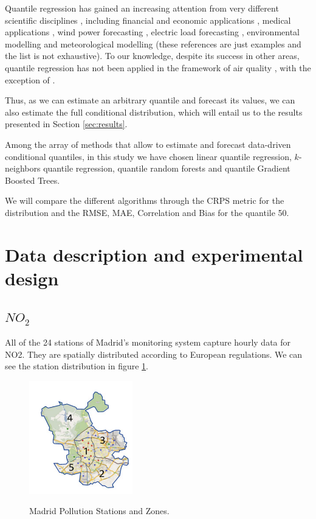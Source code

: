 \documentclass[a4paper,twocolumn,5p]{elsarticle}
\begin{document}
Quantile regression has gained an increasing attention from very
different scientific disciplines \cite{yu_quantile_2003}, including
financial and economic applications \cite{ben_rejeb_financial_2016},
medical applications \cite{jang_quantile_2018}, wind power
forecasting \cite{wan_direct_2017}, electric load forecasting
\cite{lebotsa_short_2018}, environmental modelling
\cite{cade_gentle_2003} and meteorological modelling
\cite{baur_modelling_2004} (these references are just
examples and the list is not exhaustive). To our knowledge, despite
its success in other areas, quantile regression has not been applied
in the framework of air quality , with the exception of
 \cite{martinezsilva_forecasting_2016}.

Thus, as we can estimate an arbitrary quantile and forecast its
values, we can also estimate the full conditional distribution, which
will entail us to the results presented in Section \ref{sec:results}.

Among the array of methods that allow to estimate and forecast
data-driven conditional quantiles, in this study we have chosen
linear quantile regression,
$k$-neighbors quantile regression, 
quantile random forests and quantile Gradient Boosted Trees. 

We will compare the different algorithms through the CRPS metric for the 
distribution and the RMSE, MAE, Correlation and Bias for the quantile 50.

\section{Data description and experimental design}

\subsection{$NO_2$}
\label{sec:no2}
All of the 24 stations of Madrid’s monitoring system capture hourly data for NO2. 
They are spatially distributed according to European regulations.
We can see the station distribution in figure \ref{figure:stations}.

\begin{figure}
  \centering
      \includegraphics[width=0.4\textwidth]{zonas_madrid}
      \label{figure:stations}
  \caption{Madrid Pollution Stations and Zones.}
\end{figure} 
\end{document}
